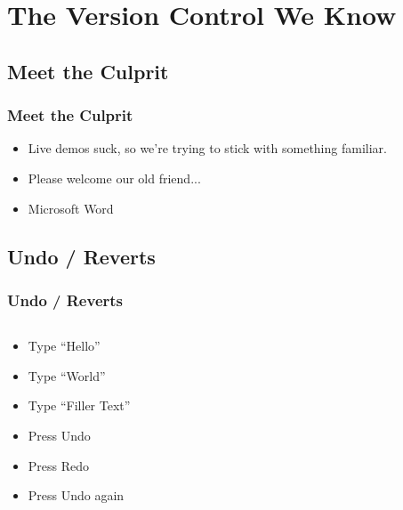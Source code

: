 \documentclass{beamer}
\begin{document}
\section{The Version Control We Know}

\subsection{Meet the Culprit}
\begin{frame}
    \frametitle{Meet the Culprit}
    \begin{itemize}[<+->]
        \item Live demos suck, so we're trying to stick with something familiar.
        \item Please welcome our old friend...
        \item Microsoft Word
    \end{itemize}
\end{frame}

\subsection{Undo / Reverts}
\begin{frame}
    \frametitle{Undo / Reverts}

    \begin{columns}
        \begin{column}{0.5\textwidth}
            \begin{itemize}[<+->]
                    \pause
                \item Type ``Hello''
                \item Type ``World''
                \item Type ``Filler Text''
                \item Press Undo
                \item Press Redo
                \item Press Undo again
            \end{itemize}
        \end{column}
        \begin{column}{0.5\textwidth}
        \end{column}
    \end{columns}
\end{frame}
\end{document}
